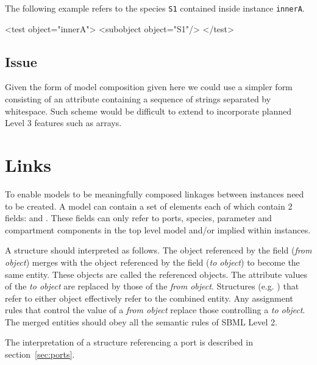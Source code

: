 \documentclass{cekarticle}
\begin{document}
The following example refers to the species \texttt{S1} contained inside instance \texttt{innerA}.

\begin{example}
<test object="innerA">
    <subobject object="S1"/>
</test>
\end{example}

\subsection{Issue}

Given the form of model composition given here we could use a simpler form consisting of an attribute containing a
sequence of  strings separated by whitespace. Such scheme would be difficult to extend to incorporate planned
Level 3 features such as arrays.

\section{Links}
\label{sec:links}

To enable models to be meaningfully composed linkages between instances need to be
created.  A model can contain a set of  elements each of which contain 2
fields:  and .
These fields can only refer to ports, species, parameter and compartment components
in the top level model and/or 
implied within instances.

A  structure should interpreted as follows.  The object referenced by the
 field (\emph{from object})
merges with the object referenced by the  field (\emph{to object}) to
become the same entity.  These objects are called the referenced objects. 
The attribute values 
of the \emph{to object}
are replaced by those of the \emph{from object}.
 Structures (e.g. ) that refer to either
object effectively refer to the combined entity.
Any assignment rules that control the value of a \emph{from object} replace those
controlling a \emph{to object}.  The merged entities should obey all the semantic rules
of SBML Level 2.

The interpretation of a  structure referencing a port is described 
in section~\ref{sec:ports}.
\end{document}
